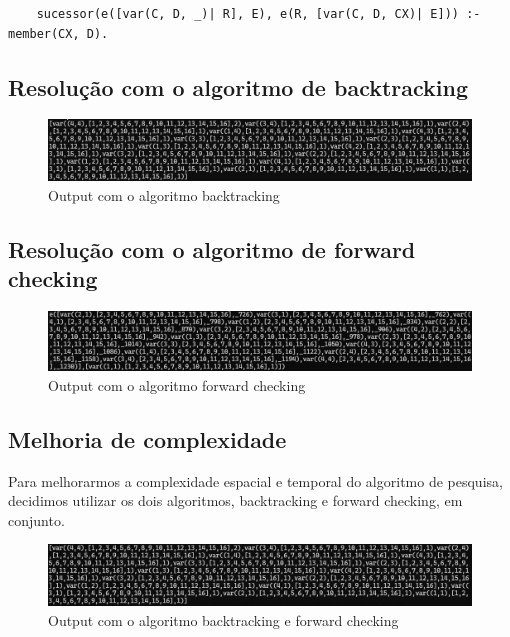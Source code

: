 \documentclass{article}
\begin{document}
\begin{verbatim}
    sucessor(e([var(C, D, _)| R], E), e(R, [var(C, D, CX)| E])) :- member(CX, D).
\end{verbatim}

\subsection{Resolução com o algoritmo de backtracking}
\begin{figure}[ht]
    \centering
    \includegraphics[width=\textwidth,height=\textheight,keepaspectratio]{image3.png}
    \caption{Output com o algoritmo backtracking}
    \label{fig:Resolução do cubo mágico com o algoritmo backtracking}
\end{figure}
\newpage
\subsection{Resolução com o algoritmo de forward checking}
\begin{figure}[ht]
    \centering
    \includegraphics[width=\textwidth,height=\textheight,keepaspectratio]{image4.png}
    \caption{Output com o algoritmo forward checking}
    \label{fig:Resolução do cubo mágico com o algoritmo forward checking}
\end{figure}

\subsection{Melhoria de complexidade}
Para melhorarmos a complexidade espacial e temporal do algoritmo de pesquisa, decidimos utilizar os dois algoritmos, backtracking e forward checking, em conjunto.
\begin{figure}[h]
    \centering
    \includegraphics[width=\textwidth,height=\textheight,keepaspectratio]{image5.png}
    \caption{Output com o algoritmo backtracking e forward checking}
    \label{fig:Resolução do cubo mágico com o algoritmo backtracking e forward checking}
\end{figure}
\end{document}
